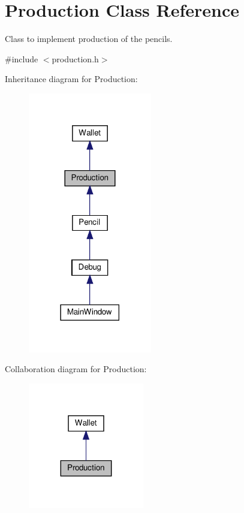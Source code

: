 \hypertarget{classProduction}{}\section{Production Class Reference}
\label{classProduction}


Class to implement production of the pencils.  




{\ttfamily \#include $<$production.\+h$>$}



Inheritance diagram for Production\+:\nopagebreak
\begin{figure}[H]
\begin{center}
\leavevmode
\includegraphics[width=153pt]{classProduction__inherit__graph}
\end{center}
\end{figure}


Collaboration diagram for Production\+:\nopagebreak
\begin{figure}[H]
\begin{center}
\leavevmode
\includegraphics[width=143pt]{classProduction__coll__graph}
\end{center}
\end{figure}
